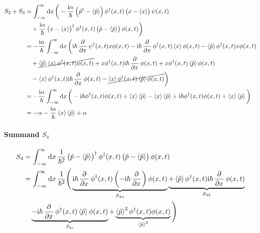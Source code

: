 \begin{align*}
	S_2 + S_3
	&= \int_{-\infty}^\infty \dif x \, \bigg(
	- \frac{\ii \alpha}{\hbar} \del{\hat p^\dagger - \bracket{\hat p}} \phi^\dagger(x, t) \del{x - \bracket x} \psi(x, t) \\
	&\quad + \frac{\ii \alpha}{\hbar} \del{x - \bracket x}^\dagger \phi^\dagger(x, t) \del{\hat p - \bracket{\hat p}} \phi(x, t)
	\bigg) \\
	&= -\frac{\ii \alpha}{\hbar} \int_{-\infty}^\infty \dif x \, \bigg(
	\ii \hbar \dpd{}x \psi^\dagger(x, t) x \phi(x, t) - \ii \hbar \dpd{}x \phi^\dagger(x, t) \bracket x \phi(x, t) - \bracket{\hat p} \phi^\dagger(x, t) x \phi(x, t) \\
	&\quad + \cancel{\bracket{\hat p} \bracket{x} \phi^\dagger(x, t) \phi(x, t)}
	+ x \phi^\dagger(x, t) \ii \hbar \dpd{}x \phi(x, t) + x \phi^\dagger(x, t) \bracket{\hat p} \phi(x, t) \\
	&\quad - \bracket x \phi^\dagger(x, t) \ii \hbar \dpd{}x \phi(x, t) - \cancel{\bracket x \phi^\dagger(x, t) \bracket{\hat p} \phi(x, t)}
	\bigg) \\
	&= -\frac{\ii \alpha}{\hbar} \int_{-\infty}^\infty \dif x \, \bigg(
	- \ii \hbar \phi^\dagger(x, t) \phi(x, t) + \bracket x \bracket{\hat p} - \bracket x \bracket{\hat p} + \ii \hbar \phi^\dagger(x, t) \phi(x, t) + \bracket x \bracket{\hat p}
	\bigg) \\
	&= - \alpha - \frac{\ii \alpha}{\hbar} \bracket x \bracket{\hat p} + \alpha
\end{align*}

\fehlt

\paragraph{Summand $S_4$}

\begin{align*}
	S_4
	&= \int_{-\infty}^\infty \dif x \, \frac{1}{\hbar^2} \del{\hat p - \bracket{\hat p}}^\dagger \phi^\dagger(x, t) \del{\hat p - \bracket{\hat p}} \phi(x, t) \\
	&= \int_{-\infty}^\infty \dif x \, \frac{1}{\hbar^2} \Bigg(
	\underbrace{
		\ii \hbar \dpd{}x \phi^\dagger(x, t) \del{- \ii \hbar \dpd{}x} \phi(x, t)
}_{S_{4a}}
	\underbrace{
	+
	\bracket{\hat p} \phi^\dagger(x, t) \ii \hbar \dpd{}x \phi(x, t)
}_{S_{4b}} \\
&\quad \underbrace{
	-
	\ii \hbar \dpd{}x \phi^\dagger(x, t) \bracket{\hat p} \phi(x, t)
}_{S_{4c}}
	+ \underbrace{\bracket{\hat p}^2 \phi^\dagger(x, t) \phi(x, t)}_{\bracket{\hat p}^2}
	\Bigg)
\end{align*}

